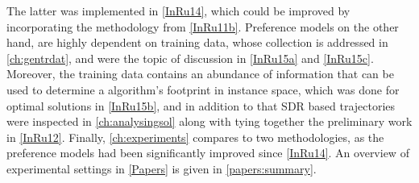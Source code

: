 The latter was implemented in \cref{InRu14}, which could be improved by 
incorporating the methodology from \cref{InRu11b}.
Preference models on  the other hand, are highly dependent on training data, 
whose collection is addressed in \cref{ch:gentrdat}, and were the topic of 
discussion in \cref{InRu15a} and \cref{InRu15c}. Moreover, the training 
data contains an abundance of information that can be used to determine a
algorithm's footprint in instance space, which was done for optimal solutions 
in \cref{InRu15b}, and in addition to that SDR based trajectories were 
inspected in \cref{ch:analysingsol} along with tying together the preliminary 
work in \cref{InRu12}. 
Finally, \cref{ch:experiments} compares to two methodologies, as the preference 
models had been significantly improved since \cref{InRu14}.
An overview of experimental settings in \cref{Papers} is given in 
\cref{papers:summary}.
    

